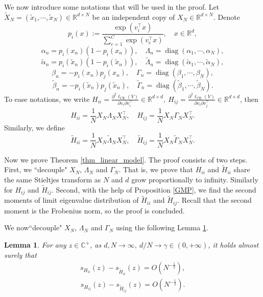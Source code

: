 \documentclass{article}
\newcommand{\diag}{\operatorname{diag}}
\newcommand{\R}{\mathbb{R}}
\newcommand{\mb}{\mathbb}
\newcommand{\wt}{\widetilde}
\newcommand{\rw}{\rightarrow}
\newcommand{\1}{^{(1)}}
\newcommand{\2}{^{(2)}}
\renewcommand{\l}{\left}
\renewcommand{\r}{\right}
\newtheorem{lem}{Lemma}
\newcommand{\bea}{\begin{equation}\begin{aligned}}
\newcommand{\eea}{\end{aligned}\end{equation}}
\begin{document}
We now introduce some notations that will be used in the proof. Let $\wt{X}_N=(\wt{x}_1,\cdots,\wt{x}_N) \in \mathbb{R}^{d\times N}$ be an independent copy of $X_N  \in \mathbb{R}^{d\times N}$. Denote
$$p_{i}(x) := \frac{\exp({v_i^\top x})}{\sum_{c=1}^C\exp({v_c^\top x})},\quad x\in \R^d,$$
$$
\alpha_n=p_i(x_n)(1-p_i(x_n)),\quad \Lambda_n=\diag(\alpha_1,\cdots,\alpha_N),
$$
$$
\wt{\alpha}_n=p_i(\wt{x}_n)(1-p_i(\wt{x}_n)),\quad \wt{\Lambda}_n=\diag(\wt{\alpha}_1,\cdots,\wt{\alpha}_N),
$$
$$
\beta_n=-p_i(x_n)p_j(x_n),\quad \Gamma_n=\diag(\beta_1,\cdots,\beta_N),
$$
$$
\wt{\beta}_n=-p_i(\wt{x}_n)p_j(\wt{x}_n),\quad \wt{\Gamma}_n=\diag(\wt{\beta}_1,\cdots,\wt{\beta}_N).
$$
To ease notations, we write $H_{ii}=\frac{\partial^2\ell_{\text{CE}}(V)}{\partial v_i  \partial v_i^\top} \in \mathbb{R}^{d\times d},\ H_{ij}=\frac{\partial^2\ell_{\text{CE}}(V)}{\partial v_i  \partial v_j^\top} \in \mathbb{R}^{d\times d}$, then
$$H_{ii}=\frac{1}{N}X_N\Lambda_NX_N^\top,\quad  H_{ij}=\frac{1}{N}X_N\Gamma_NX_N^\top.$$
Similarly, we define
$$
\wt{H}_{ii}=\frac{1}{N}X_N\wt{\Lambda}_NX_N^\top, \quad \wt{H}_{ij}=\frac{1}{N}X_N\wt{\Gamma}_NX_N^\top.
$$

Now we prove Theorem \ref{thm_linear_model}. The proof consists of two steps. First, we ``decouple" $X_N$, $\Lambda_N$ and $\Gamma_N$.  That is, we prove that ${H}_{ii}$ and $\wt{H}_{ii}$ share the same Stieltjes transform as $N$ and $d$ grow proportionally to infinity. Similarly for ${H}_{ij}$ and $\wt{H}_{ij}$. Second, with the help of Proposition \ref{GMP}, we find the second moments of limit eigenvalue distribution of  $\wt{H}_{ii}$ and $\wt{H}_{ij}$. Recall that the second moment is the Frobenius norm, so the proof is concluded. 

We now``decouple" $X_N$, $\Lambda_N$ and $\Gamma_N$ using the following Lemma \ref{decoupling}.

\begin{lem}\label{decoupling}
For any $z\in \mb{C}^+$, as $d,N\rw \infty,\ d/N\rw\gamma\in (0,+\infty)$, it holds almost surely that
\bea
s_{H_{ii}}(z)-s_{\wt{H}_{ii}}(z)=O\l(N^{-\frac{1}{2}}\r),
\eea
\bea
s_{H_{ij}}(z)-s_{\wt{H}_{ij}}(z)=O\l(N^{-\frac{1}{2}}\r).
\eea

\end{lem}
\end{document}

